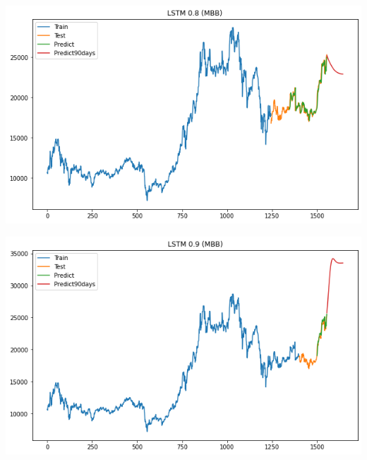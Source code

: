 \documentclass[conference]{IEEEtran}
\begin{document}
\begin{minipage}{0.23\textwidth}
    \centering
    \includegraphics[width=\linewidth]{images/LSTM/LSTM_MBB_90days_82.png}
    \label{fig:image1}
\end{minipage}
\hfill
\begin{minipage}{0.23\textwidth}
    \centering
    \includegraphics[width=\linewidth]{images/LSTM/LSTM_MBB_90days_91.png}
    \label{fig:image2}
\end{minipage}
\end{document}
